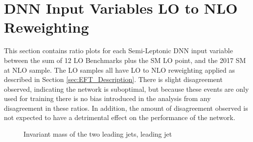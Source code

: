 \chapter{DNN Input Variables LO to NLO Reweighting}
\label{sec:DNN-Input-Variables-LO_NLO_Weight_Validation}

This section contains ratio plots for each Semi-Leptonic DNN input variable between the sum of 12 LO Benchmarks plus the SM LO point, and the 2017 SM at NLO sample.
The LO samples all have LO to NLO reweighting applied as described in Section \ref{sec:EFT_Description}. There is slight disagreement observed, indicating the network 
is suboptimal, but because these events are only used for training there is no bias introduced in the analysis from any disagreement in these ratios. In addition,
the amount of disagreement observed is not expected to have a detrimental effect on the performance of the network. 

\newpage 

\begin{figure}[h!]
    \setcounter{subfigure}{0}
    \centering
    \qquad
    \caption{Invariant mass of the two leading jets, leading jet \pt}
\end{figure}

